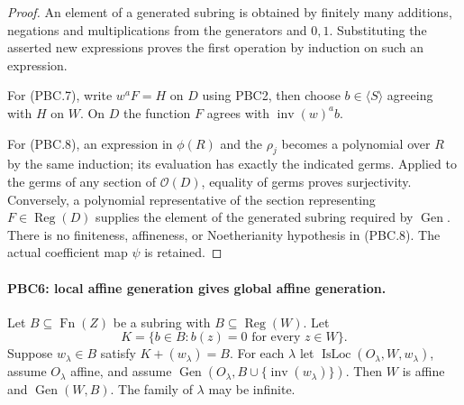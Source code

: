 \documentclass[11pt,a4paper]{article}
\numberwithin{equation}{section}
\theoremstyle{remark}\newtheorem{remark}[theorem]{Remark}
\begin{document}
\begin{proof}
An element of a generated subring is obtained by finitely many
additions, negations and multiplications from the generators and
$0,1$.  Substituting the asserted new expressions proves the first
operation by induction on such an expression.

For (PBC.7), write $w^aF=H$ on $D$ using PBC2, then choose
$b\in\langle S\rangle$ agreeing with $H$ on $W$.
On $D$ the function $F$ agrees with
$\operatorname{inv}(w)^a b$.

For (PBC.8), an expression in $\phi(R)$ and the $\rho_j$ becomes a
polynomial over $R$ by the same induction; its evaluation has exactly
the indicated germs.  Applied to the germs of any section of
$\mathcal O(D)$, equality of germs proves surjectivity.
Conversely, a polynomial representative of the section representing
$F\in\operatorname{Reg}(D)$ supplies the element of the generated
subring required by $\operatorname{Gen}$.  There is no finiteness,
affineness, or Noetherianity hypothesis in (PBC.8).  The actual
coefficient map $\psi$ is retained.
\end{proof}

\paragraph{PBC6: local affine generation gives global affine generation.}
\label{claim:PBC6}
Let $B\subseteq\operatorname{Fn}(Z)$ be a subring with
$B\subseteq\operatorname{Reg}(W)$.  Let
\[
 K=\{b\in B:b(z)=0\text{ for every }z\in W\}.
                                                        \tag{PBC.9}
\]
Suppose $w_\lambda\in B$ satisfy $K+(w_\lambda)=B$.
For each $\lambda$ let
$\operatorname{IsLoc}(O_\lambda,W,w_\lambda)$, assume
$O_\lambda$ affine, and assume
$\operatorname{Gen}(O_\lambda,B\cup\{\operatorname{inv}(w_\lambda)\})$.
Then $W$ is affine and $\operatorname{Gen}(W,B)$.
The family of $\lambda$ may be infinite.
\end{document}
